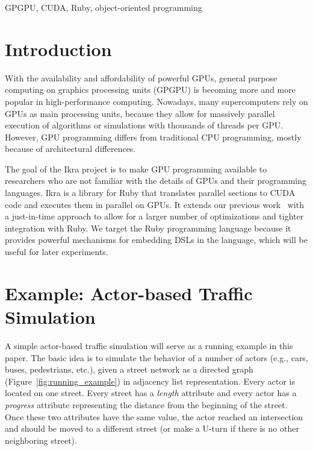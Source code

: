 \documentclass[preprint]{sigplanconf}
\begin{document}


\keywords
GPGPU, CUDA, Ruby, object-oriented programming

\section{Introduction}
With the availability and affordability of powerful GPUs, general purpose computing on graphics processing units (GPGPU) is becoming more and more popular in high-performance computing. Nowadays, many supercomputers rely on GPUs as main processing units, because they allow for massively parallel execution of algorithms or simulations with thousands of threads per GPU. However, GPU programming differs from traditional CPU programming, mostly because of architectural differences.

The goal of the Ikra project is to make GPU programming available to researchers who are not familiar with the details of GPUs and their programming languages. Ikra is a library for Ruby that translates parallel sections to CUDA code and executes them in parallel on GPUs. It extends our previous work~\cite{Masuhara:2012:DER:2237887.2237888} with a just-in-time approach to allow for a larger number of optimizations and tighter integration with Ruby. We target the Ruby programming language because it provides powerful mechanisms for embedding DSLs in the language, which will be useful for later experiments.

\section{Example: Actor-based Traffic Simulation}
A simple actor-based traffic simulation will serve as a running example in this paper. The basic idea is to simulate the behavior of a number of actors (e.g., cars, buses, pedestrians, etc.), given a street network as a directed graph (Figure~\ref{fig:running_example}) in adjacency list representation. Every actor is located on one street. Every street has a \emph{length} attribute and every actor has a \emph{progress} attribute representing the distance from the beginning of the street. Once these two attributes have the same value, the actor reached an intersection and should be moved to a different street (or make a U-turn if there is no other neighboring street).
\end{document}
